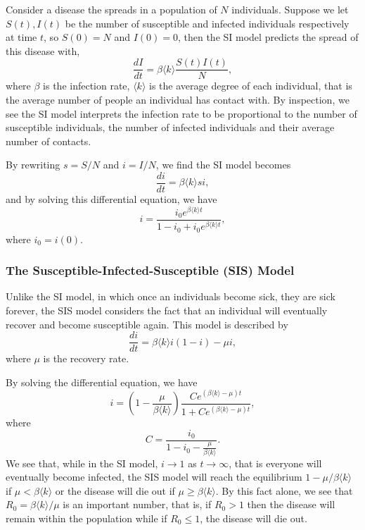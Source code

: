 \documentclass[
]{article}
\theoremstyle{definition}
\theoremstyle{definition}
\begin{document}
Consider a disease the spreads in a population of \(N\) individuals.
Suppose we let \(S(t), I(t)\) be the number of susceptible and infected
individuals respectively at time \(t\), so \(S(0) = N\) and
\(I(0) = 0\), then the SI model predicts the spread of this disease
with, \[\frac{dI}{dt} = \beta \langle k \rangle \frac{S(t) I(t)}{N},\]
where \(\beta\) is the infection rate, \(\langle k \rangle\) is the
average degree of each individual, that is the average number of people
an individual has contact with. By inspection, we see the SI model
interprets the infection rate to be proportional to the number of
susceptible individuals, the number of infected individuals and their
average number of contacts.

By rewriting \(s = S / N\) and \(i = I / N\), we find the SI model
becomes \[\frac{di}{dt} = \beta \langle k \rangle si,\] and by solving
this differential equation, we have
\[i = \frac{i_0 e^{\beta\langle k \rangle t}}{1 - i_0 + i_0 e^{\beta\langle k \rangle t}},\]
where \(i_0 = i(0)\).

\hypertarget{the-susceptible-infected-susceptible-sis-model}{%
\subsubsection{The Susceptible-Infected-Susceptible (SIS)
Model}\label{the-susceptible-infected-susceptible-sis-model}}

Unlike the SI model, in which once an individuals become sick, they are
sick forever, the SIS model considers the fact that an individual will
eventually recover and become susceptible again. This model is described
by \[\frac{di}{dt} = \beta \langle k \rangle i(1 - i) - \mu i,\] where
\(\mu\) is the recovery rate.

By solving the differential equation, we have
\[i = \left(1 - \frac{\mu}{\beta \langle k \rangle}\right)
  \frac{Ce^{(\beta\langle k \rangle - \mu)t}}{1 +Ce^{(\beta\langle k \rangle - \mu)t}},\]
where \[C = \frac{i_0}{1 - i_0 - \frac{\mu}{\beta \langle k \rangle}}.\]
We see that, while in the SI model, \(i \to 1\) as \(t \to \infty\),
that is everyone will eventually become infected, the SIS model will
reach the equilibrium \(1 - \mu / \beta \langle k \rangle\) if
\(\mu < \beta \langle k \rangle\) or the disease will die out if
\(\mu \ge \beta \langle k \rangle\). By this fact alone, we see that
\(R_0 = \beta \langle k \rangle / \mu\) is an important number, that is,
if \(R_0 > 1\) then the disease will remain within the population while
if \(R_0 \le 1\), the disease will die out.
\end{document}
